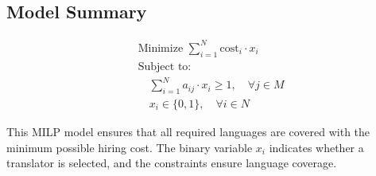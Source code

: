 \documentclass{article}
\begin{document}
\subsection*{Model Summary}
\begin{align*}
    & \text{Minimize } \sum_{i=1}^{N} \text{cost}_i \cdot x_i \\
    & \text{Subject to: } \\
    & \quad \sum_{i=1}^{N} a_{ij} \cdot x_i \geq 1, \quad \forall j \in M \\
    & \quad x_i \in \{0, 1\}, \quad \forall i \in N
\end{align*}

This MILP model ensures that all required languages are covered with the minimum possible hiring cost. The binary variable \( x_i \) indicates whether a translator is selected, and the constraints ensure language coverage.
\end{document}
